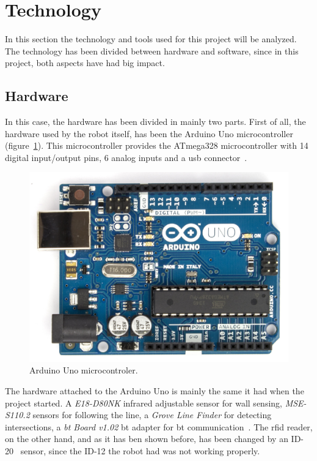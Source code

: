 \section{Technology}

In this section the technology and tools used for this project will be analyzed. The technology has
been divided between hardware and software, since in this project, both aspects have had big impact.

\subsection{Hardware}

In this case, the hardware has been divided in mainly two parts. First of all, the hardware used by
the robot itself, has been the Arduino Uno microcontroller (figure~\ref{fig:arduino_board}). This
microcontroller provides the ATmega328 microcontroller with 14 digital input/output pins, 6 analog
inputs and a \acrshort{usb} connector~\cite{arduino_datasheet}.

\begin{figure}[!htbp]
	\centering
	\includegraphics[height=0.3\textheight]{fig/arduino-board.jpg}
	\caption{Arduino Uno microcontroler.}
	\label{fig:arduino_board}
\end{figure}

The hardware attached to the Arduino Uno is mainly the same it had when the project started. A
\emph{E18-D80NK} infrared adjustable sensor for wall sensing, \emph{MSE-S110.2} sensors for
following the line, a \emph{Grove Line Finder} for detecting intersections, a
\emph{\acrshort{bt} Board v1.02} \acrlong{bt} adapter for \acrlong{bt} communication~\cite{fdp_itu}.
The \acrshort{rfid} reader, on the other hand, and as it has ben shown before, has been changed by
an ID-20~\cite{rfid} sensor, since the ID-12 the robot had was not working properly.


